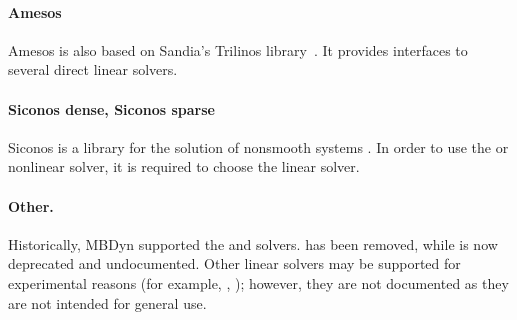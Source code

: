 \paragraph{Amesos}
Amesos is also based on Sandia's Trilinos library~\cite{TRILINOS-WEBSITE}.
It provides interfaces to several direct linear solvers.

\paragraph{Siconos dense, Siconos sparse}
Siconos is a library for the solution of nonsmooth systems \cite{SICONOS-WEBSITE}.
In order to use the  or  nonlinear solver,
it is required to choose the  linear solver.

\paragraph{Other.}
Historically, MBDyn supported the  and  solvers.
 has been removed, while 
is now deprecated and undocumented.
Other linear solvers may be supported for experimental reasons
(for example, , );
however, they are not documented as they are not intended for general use.


